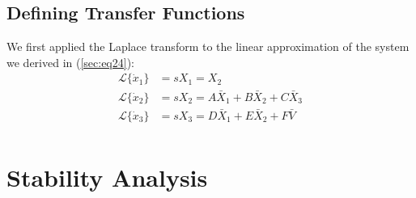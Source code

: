 \documentclass[a4paper,10pt,reqno]{amsart}
\numberwithin{equation}{section}
\newcommand{\lap}{\mathscr{L}}
\begin{document}
\subsection{Defining Transfer Functions} We first applied the Laplace transform to the linear approximation of the system we derived in (\ref{sec:eq24}):
\begin{align*}
    \lap\{\dot x_1\} &= sX_1 = X_2 \\
    \lap\{\dot x_2\} &= sX_2 = A\bar X_1+B\bar X_2+C\bar X_3 \\
    \lap\{\dot x_3\} &= sX_3 = D\bar X_1+E\bar X_2+F\bar V \\
\end{align*}
\section{Stability Analysis}
\end{document}

